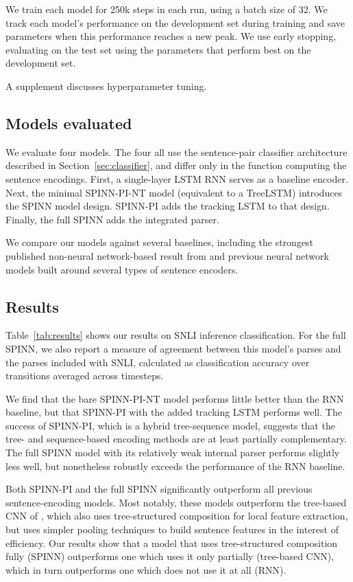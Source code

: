 \documentclass[11pt]{article}
\begin{document}
We train each model for 250k steps in each run, using a batch size of 32. We track each model's performance on the development set during training and save parameters when this performance reaches a new peak. We use early stopping, evaluating on the test set using the parameters that perform best on the development set.

A supplement discusses hyperparameter tuning.

\subsection{Models evaluated}

We evaluate four models. The four all use the sentence-pair classifier architecture described in Section~\ref{sec:classifier}, and differ only in the function computing the sentence encodings. First, a single-layer LSTM RNN \citep[similar to that of][]{snli:emnlp2015} serves as a baseline encoder. Next, the minimal SPINN-PI-NT model (equivalent to a TreeLSTM) introduces the SPINN model design. SPINN-PI adds the tracking LSTM to that design. Finally, the full SPINN adds the integrated parser.

We compare our models against several baselines, including the strongest published non-neural network-based result from \citet{snli:emnlp2015} and previous neural network models built around several types of sentence encoders.

\subsection{Results}

Table~\ref{tab:results} shows our results on SNLI inference classification. For the full SPINN, we also report a measure of agreement between this model's parses and the parses included with SNLI, calculated as classification accuracy over transitions averaged across timesteps.

We find that the bare SPINN-PI-NT model performs little better than the RNN baseline, but that SPINN-PI with the added tracking LSTM performs well. The success of SPINN-PI, which is a hybrid tree-sequence model, suggests that the tree- and sequence-based encoding methods are at least partially complementary. The full SPINN model with its relatively weak internal parser performs slightly less well, but nonetheless robustly exceeds the performance of the RNN baseline.

Both SPINN-PI and the full SPINN significantly outperform all previous sentence-encoding models. Most notably, these models outperform the tree-based CNN of \citet{mou2015recognizing}, which also uses tree-structured composition for local feature extraction, but uses simpler pooling techniques to build sentence features in the interest of efficiency. Our results show that a model that uses tree-structured composition fully (SPINN) outperforms one which uses it only partially (tree-based CNN), which in turn outperforms one which does not use it at all (RNN).
\end{document}
